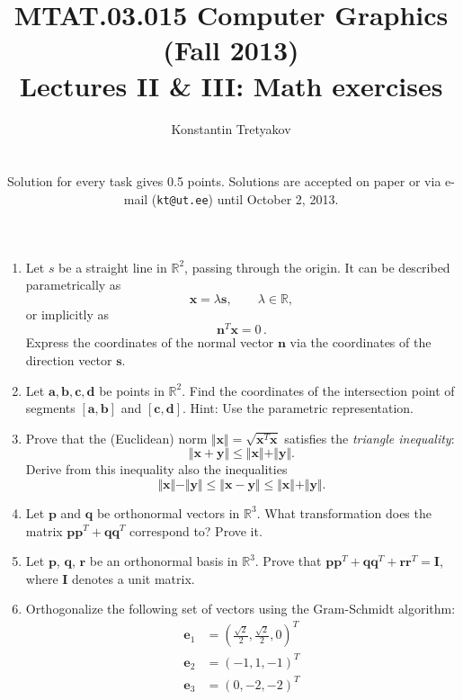 \documentclass{article}
\newcommand{\norm}[1]{\Vert #1 \Vert}
\newcommand{\bbR}{\mathbb{R}}
\newcommand{\bx}{\mathbf{x}}
\newcommand{\bd}{\mathbf{d}}
\newcommand{\bb}{\mathbf{b}}
\newcommand{\bs}{\mathbf{s}}
\newcommand{\bn}{\mathbf{n}}
\newcommand{\ba}{\mathbf{a}}
\newcommand{\bc}{\mathbf{c}}
\newcommand{\bq}{\mathbf{q}}
\newcommand{\be}{\mathbf{e}}
\newcommand{\br}{\mathbf{r}}
\newcommand{\by}{\mathbf{y}}
\newcommand{\bp}{\mathbf{p}}
\newcommand{\bI}{\mathbf{I}}
\begin{document}
\title{MTAT.03.015 Computer Graphics (Fall 2013)\\
Lectures II \& III: Math exercises}
\author{Konstantin Tretyakov\\
\medskip
\\
\parbox{9cm}{\small Solution for every task gives 0.5 points. Solutions are accepted on paper or via e-mail (\texttt{kt@ut.ee}) until October 2, 2013.}
}
\date{}
\maketitle


\begin{enumerate}
\item Let $s$ be a straight line in $\bbR^2$, passing through the origin. It can be described parametrically as
$$
\bx = \lambda \bs, \qquad \lambda \in \bbR,
$$
or implicitly as
$$
\bn^T\bx = 0\,.
$$
Express the coordinates of the normal vector $\bn$ via the coordinates of the direction vector $\bs$.

\item Let $\ba, \bb, \bc, \bd$ be points in $\bbR^2$. Find the coordinates of the intersection point of segments $[\ba, \bb]$ and $[\bc, \bd]$. Hint: Use the parametric representation.

\item Prove that the (Euclidean) norm $\Vert \bx \Vert = \sqrt{\bx^T\bx}$ satisfies the \emph{triangle inequality}:
$$
\Vert \bx + \by \Vert \leq \Vert \bx \Vert + \Vert \by \Vert.
$$
Derive from this inequality also the inequalities 
$$\norm{\bx}-\norm{\by} \leq \norm{\bx - \by} \leq \norm{\bx} + \norm{\by}.$$

\item Let $\bp$ and $\bq$ be orthonormal vectors in $\bbR^3$. What transformation does the matrix $\bp\bp^T + \bq\bq^T$ correspond to? Prove it.

\item Let $\bp$, $\bq$, $\br$ be an orthonormal basis in $\bbR^3$. Prove that $\bp\bp^T + \bq\bq^T + \br\br^T = \bI$, where $\bI$ denotes a unit matrix.

\item Orthogonalize the following set of vectors using the Gram-Schmidt algorithm:
\begin{align*}
 \be_1 &= (\frac{\sqrt{2}}{2},\frac{\sqrt{2}}{2},0)^T \\
 \be_2 &= (-1, 1, -1)^T \\
 \be_3 &= (0, -2, -2)^T \\
\end{align*}


\end{enumerate}
\end{document}
